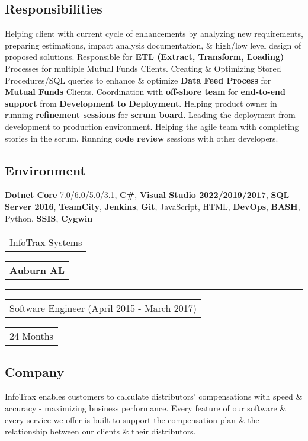 \documentclass[letterpaper,11pt]{article}
\begin{document}
    \subsection{Responsibilities}
    Helping client with current cycle of enhancements by analyzing new requirements, preparing estimations, impact analysis documentation, \& high/low level design of proposed solutions. Responsible for \textbf{ETL (Extract, Transform, Loading)} Processes for multiple Mutual Funds Clients. Creating \& Optimizing Stored Procedures/SQL queries to enhance \& optimize \textbf{Data Feed Process} for \textbf{Mutual Funds} Clients. Coordination with \textbf{off-shore team} for \textbf{end-to-end support} from \textbf{Development to Deployment}. Helping product owner in running \textbf{refinement sessions} for \textbf{scrum board}. Leading the deployment from development to production environment. Helping the agile team with completing stories in the scrum. Running \textbf{code review} sessions with other developers.


    \subsection{Environment}
    \textbf{Dotnet Core} 7.0/6.0/5.0/3.1, \textbf{C\#}, \textbf{Visual Studio 2022/2019/2017}, \textbf{SQL Server 2016}, \textbf{TeamCity}, \textbf{Jenkins}, \textbf{Git}, JavaScript, HTML, \textbf{DevOps}, \textbf{BASH}, Python, \textbf{SSIS}, \textbf{Cygwin}

    \pagebreak


    \vspace{1.27cm}
    \noindent
    \begin{tabular}[t]{@{}l}
    \Large{InfoTrax Systems}
    \end{tabular}
    \hfill
    \begin{tabular}[t]{l@{}}
    \textbf{Auburn AL}
    \end{tabular}
    \noindent\rule{\textwidth}{0.5pt}
    \begin{tabular}[t]{@{}l}
    Software Engineer (April 2015 - March 2017)
    \end{tabular}
    \hfill
    \begin{tabular}[t]{l@{}}
    24 Months
    \end{tabular}

    \subsection{Company}
    InfoTrax enables customers to calculate distributors’ compensations with speed \& accuracy - maximizing business performance. Every feature of our software \& every service we offer is built to support the compensation plan \& the relationship between our clients \& their distributors.
\end{document}
